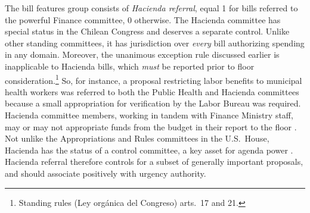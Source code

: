 \documentclass[letter,12pt]{article}
\begin{document}
The bill features group consists of \emph{Hacienda referral}, equal 1 for bills referred to the powerful Finance committee, 0 otherwise. The Hacienda committee has special status in the Chilean Congress and deserves a separate control. Unlike other standing committees, it has jurisdiction over \emph{every} bill authorizing spending in any domain. Moreover, the unanimous exception rule discussed earlier is inapplicable to Hacienda bills, which \emph{must} be reported prior to floor consideration.\footnote{Standing rules (Ley orgánica del Congreso) arts.\ 17 and 21.} So, for instance, a proposal restricting labor benefits to municipal health workers was referred to both the Public Health and Hacienda committees because a small appropriation for verification by the Labor Bureau was  required. Hacienda committee members, working in tandem with Finance Ministry staff, may or may not appropriate funds from the budget in their report to the floor \citep{aleman.navia.UrgChi.2009}. Not unlike the Appropriations and Rules committees in the U.S.\ House, Hacienda has the status of a control committee, a key asset for agenda power \citep{kiewiet.mccubbins.1991}. Hacienda referral therefore controls for a subset of generally important proposals, and should associate positively with urgency authority. %
\end{document}
